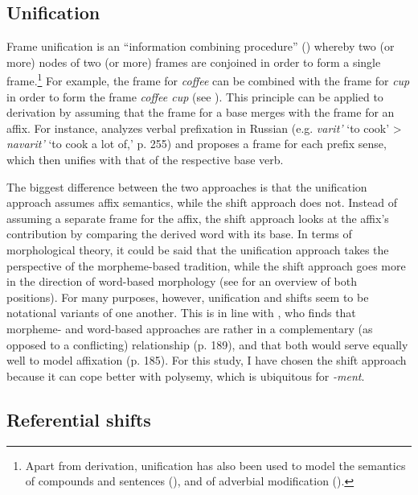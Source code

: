 \subsection{Unification}
\label{sec:fr-der-uni}

Frame unification is an ``information combining procedure'' (\citealt[158]{Petersen.2007}) whereby two (or more) nodes of two (or more) frames are conjoined in order to form a single frame.\footnote{Apart from derivation, unification has also been used to model the semantics of compounds and sentences (\citealt{Loebner.2013}), and of adverbial modification (\citealt{Goldschmidt.2017}).} 
For example, the frame for \textit{coffee} can be combined with the frame for \textit{cup} in order to form the frame \textit{coffee cup} (see \citealt[317--319]{Loebner.2013}).
This principle can be applied to derivation by assuming that the frame for a base merges with the frame for an affix. For instance, \citet{Zinova.2016} analyzes verbal prefixation in Russian (e.g. \textit{varit'} `to cook' > \textit{navarit'} `to cook a lot of,' p. 255) and proposes a frame for each prefix sense, which then unifies with that of the respective base verb. 

The biggest difference between the two approaches is that the unification approach assumes affix semantics, while the shift approach does not. Instead of assuming a separate frame for the affix, the shift approach looks at the affix's contribution by comparing the derived word with its base.
In terms of morphological theory, it could be said that the unification approach takes the perspective of the morpheme-based tradition, while the shift approach goes more in the direction of word-based morphology (see \citealt[179--190]{Plag.2003} for an overview of both positions). 
For many purposes, however, unification and shifts seem to be notational variants of one another. This is in line with \citet[]{Plag.2003}, who finds that morpheme- and word-based approaches are rather in a complementary (as opposed to a conflicting) relationship (p. 189), and that both would serve equally well to model affixation (p. 185). For this study, I have chosen the shift approach because it can cope better with polysemy, which is ubiquitous for \textit{-ment}.

\subsection{Referential shifts}
\label{sec:fr-der-ref}
\label{sec:fr-der-ref-der}
\label{sec:fr-der-ref-lex}
\label{sec:fr-der-ref-inherit}

